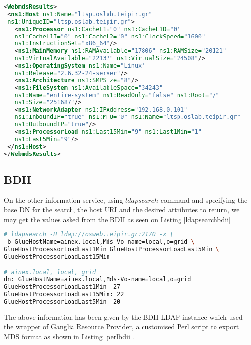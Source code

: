 \begin{lstlisting}[language=XML,caption=WebMDS results from XPath query,label=xpath_result]
<WebmdsResults>
 <ns1:Host ns1:Name="ltsp.oslab.teipir.gr" 
 ns1:UniqueID="ltsp.oslab.teipir.gr">
   <ns1:Processor ns1:CacheL1="0" ns1:CacheL1D="0" 
   ns1:CacheL1I="0" ns1:CacheL2="0" ns1:ClockSpeed="1600" 
   ns1:InstructionSet="x86_64"/>
   <ns1:MainMemory ns1:RAMAvailable="17806" ns1:RAMSize="20121" 
   ns1:VirtualAvailable="22137" ns1:VirtualSize="24508"/>
   <ns1:OperatingSystem ns1:Name="Linux" 
   ns1:Release="2.6.32-24-server"/>
   <ns1:Architecture ns1:SMPSize="8"/>
   <ns1:FileSystem ns1:AvailableSpace="34243" 
   ns1:Name="entire-system" ns1:ReadOnly="false" ns1:Root="/" 
   ns1:Size="251687"/>
   <ns1:NetworkAdapter ns1:IPAddress="192.168.0.101" 
   ns1:InboundIP="true" ns1:MTU="0" ns1:Name="ltsp.oslab.teipir.gr" 
   ns1:OutboundIP="true"/>
   <ns1:ProcessorLoad ns1:Last15Min="9" ns1:Last1Min="1" 
   ns1:Last5Min="9"/>
 </ns1:Host>
</WebmdsResults>
\end{lstlisting}

\subsection{BDII}

On the other information service, using $ldapsearch$ command and specifying the base DN for the search, the host URI and the desired attributes to return, we may get the values asked from the BDII as seen on Listing \ref{ldapsearchbdii}

\begin{lstlisting}[language=bash,caption=BDII LDAP search for Glue CE ProcessorLoad attributes,label=ldapsearcbdii]
# ldapsearch -H ldap://osweb.teipir.gr:2170 -x \
-b GlueHostName=ainex.local,Mds-Vo-name=local,o=grid \
GlueHostProcessorLoadLast1Min GlueHostProcessorLoadLast5Min \
GlueHostProcessorLoadLast15Min

# ainex.local, local, grid
dn: GlueHostName=ainex.local,Mds-Vo-name=local,o=grid
GlueHostProcessorLoadLast1Min: 27
GlueHostProcessorLoadLast15Min: 22
GlueHostProcessorLoadLast5Min: 20
\end{lstlisting}

The above information has been given by the BDII LDAP instance which used the wrapper of Ganglia Resource Provider, a customised Perl script to export MDS format as shown in Listing \ref{perlbdii}.

